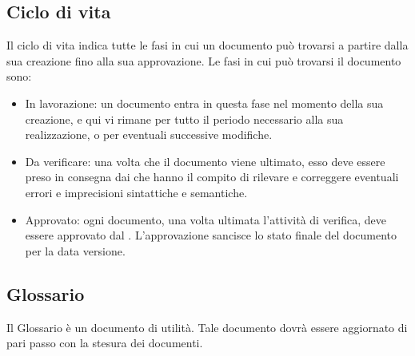 \subsection{Ciclo di vita}
Il ciclo di vita indica tutte le fasi in cui un documento può trovarsi a partire dalla sua creazione fino alla sua approvazione. Le fasi in cui può trovarsi il documento sono:
\begin{itemize}
	\item In lavorazione: un documento entra in questa fase nel momento della sua creazione, e qui vi rimane per tutto il periodo necessario alla sua realizzazione, o per eventuali successive modifiche. 
	\item Da verificare: una volta che il documento viene ultimato, esso deve essere preso in consegna dai \Verificatori che hanno il compito di rilevare e correggere eventuali errori e imprecisioni sintattiche e semantiche. 
	\item Approvato: ogni documento, una volta ultimata l'attività di verifica, deve essere approvato dal \Responsabile. L'approvazione sancisce lo stato finale del documento per la data versione.
\end{itemize}

\subsection{Glossario}
Il Glossario è un documento di utilità. Tale documento dovrà essere aggiornato di pari passo con la stesura dei documenti.